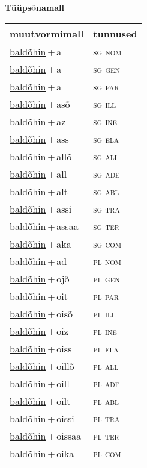 
\vspace{1.8em}
\begin{minipage}{\textwidth}
\textbf{Tüüpsõnamall \,}\\

\begin{sideways}
\begin{tabular}{l l}
muutvormimall & tunnused \\
\hline
\underline{baldõhin}\,+\,a & \textsc{ sg nom } \\
\underline{baldõhin}\,+\,a & \textsc{ sg gen } \\
\underline{baldõhin}\,+\,a & \textsc{ sg par } \\
\underline{baldõhin}\,+\,asõ & \textsc{ sg ill } \\
\underline{baldõhin}\,+\,az & \textsc{ sg ine } \\
\underline{baldõhin}\,+\,ass & \textsc{ sg ela } \\
\underline{baldõhin}\,+\,allõ & \textsc{ sg all } \\
\underline{baldõhin}\,+\,all & \textsc{ sg ade } \\
\underline{baldõhin}\,+\,alt & \textsc{ sg abl } \\
\underline{baldõhin}\,+\,assi & \textsc{ sg tra } \\
\underline{baldõhin}\,+\,assaa & \textsc{ sg ter } \\
\underline{baldõhin}\,+\,aka & \textsc{ sg com } \\
\underline{baldõhin}\,+\,ad & \textsc{ pl nom } \\
\underline{baldõhin}\,+\,ojõ & \textsc{ pl gen } \\
\underline{baldõhin}\,+\,oit & \textsc{ pl par } \\
\underline{baldõhin}\,+\,oisõ & \textsc{ pl ill } \\
\underline{baldõhin}\,+\,oiz & \textsc{ pl ine } \\
\underline{baldõhin}\,+\,oiss & \textsc{ pl ela } \\
\underline{baldõhin}\,+\,oillõ & \textsc{ pl all } \\
\underline{baldõhin}\,+\,oill & \textsc{ pl ade } \\
\underline{baldõhin}\,+\,oilt & \textsc{ pl abl } \\
\underline{baldõhin}\,+\,oissi & \textsc{ pl tra } \\
\underline{baldõhin}\,+\,oissaa & \textsc{ pl ter } \\
\underline{baldõhin}\,+\,oika & \textsc{ pl com } \\
\end{tabular}
\end{sideways}
\label{tab:tüüpsõnamall-baldõhina}

\end{minipage}

